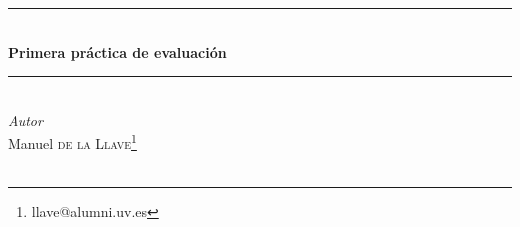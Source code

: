 \documentclass[12pt]{article}
\numberwithin{equation}{section} %
\begin{document}
\renewcommand*{\thefootnote}{\fnsymbol{footnote}} %



\begin{titlepage} %

	\newcommand{\HRule}{\rule{\linewidth}{0.5mm}} %
	
	\center %
	
	
	
	
	
	
	
	\HRule\\[0.4cm]
	
	{\huge\bfseries Primera práctica de evaluación
	}\\[0.4cm] %
	
	\HRule\\[1.5cm]
	
	\vfill
			\large
			\textit{Autor}\\
			Manuel \textsc{de la Llave}\footnote{llave@alumni.uv.es}
			\\
	~
	

\end{titlepage}
\end{document}
